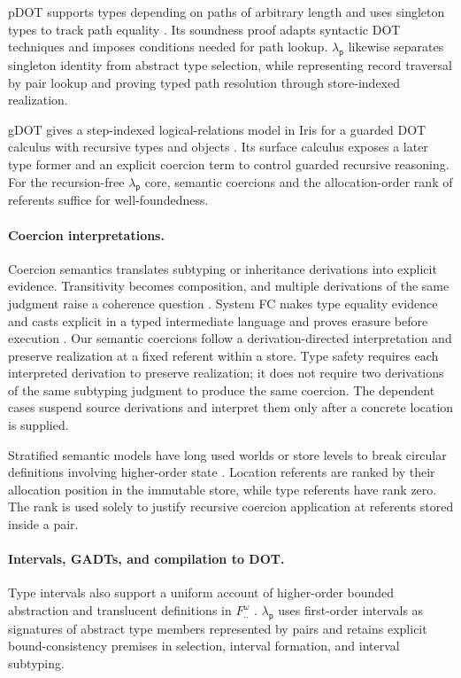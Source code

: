 \documentclass[acmsmall,screen,nonacm]{acmart}
\newcommand{\lambdap}{\ensuremath{\lambda_{\mathsf p}}}
\begin{document}
pDOT supports types depending on paths of arbitrary length and uses singleton
types to track path equality \citep{rapoport2019pdot}. Its soundness proof
adapts syntactic DOT techniques and imposes conditions needed for path
lookup. \lambdap{} likewise separates singleton identity from abstract type
selection, while representing record traversal by pair lookup and proving
typed path resolution through store-indexed realization.

gDOT gives a step-indexed logical-relations model in Iris for a guarded DOT
calculus with recursive types and objects
\citep{giarrusso2020gdot,jung2018iris}. Its surface calculus exposes a later
type former and an explicit coercion term to control guarded recursive
reasoning. For the recursion-free \lambdap{} core, semantic coercions and the
allocation-order rank of referents suffice for well-foundedness.

\paragraph{Coercion interpretations.}
Coercion semantics translates subtyping or inheritance derivations into
explicit evidence. Transitivity becomes composition, and multiple derivations
of the same judgment raise a coherence question
\citep{breazutannen1991coercion,crary2000inclusive}. System FC makes type
equality evidence and casts explicit in a typed intermediate language and
proves erasure before execution \citep{sulzmann2007systemfc}. Our semantic
coercions follow a derivation-directed interpretation and preserve
realization at a fixed referent within a store. Type safety requires each
interpreted derivation to preserve realization; it does not require two
derivations of the same subtyping judgment to produce the same coercion. The
dependent cases suspend source derivations and interpret them only after a
concrete location is supplied.

Stratified semantic models have long used worlds or store levels to break
circular definitions involving higher-order state
\citep{ahmed2002stratified}. Location referents are ranked by their allocation
position in the immutable store, while type referents have rank zero. The
rank is used solely to justify recursive coercion application at referents
stored inside a pair.

\paragraph{Intervals, GADTs, and compilation to DOT.}
Type intervals also support a uniform account of higher-order bounded
abstraction and translucent definitions in
\(F^{\omega}_{..}\) \citep{stucki2021intervals}. \lambdap{} uses first-order
intervals as signatures of abstract type members represented by pairs and
retains explicit bound-consistency premises in selection, interval formation,
and interval subtyping.
\end{document}
